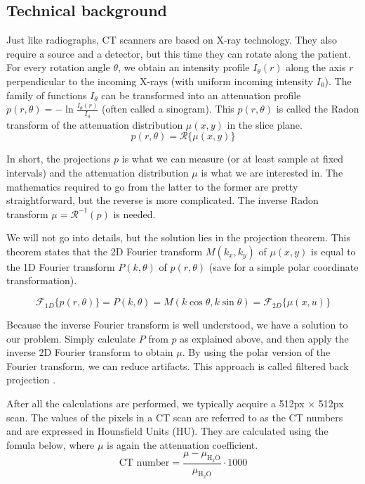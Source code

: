 \subsection{Technical background}
Just like radiographs, CT scanners are based on X-ray technology. They also
require a source and a detector, but this time they can rotate along the
patient. For every rotation angle $\theta$, we obtain an intensity profile
$I_\theta(r)$ along the axis $r$ perpendicular to the incoming X-rays (with
uniform incoming intensity $I_0$). The family of functions $I_\theta$ can be
transformed into an attenuation profile $p(r, \theta) = -\ln \tfrac{I_\theta(r)}{I_0}$
(often called a sinogram). This $p(r, \theta)$ is called the Radon transform of
the attenuation distribution $\mu(x,y)$ in the slice plane.
\begin{equation}
	p(r, \theta) = \mathscr{R}\{ \mu(x,y) \}
\end{equation}

In short, the projections $p$ is what we can measure (or at least sample at
fixed intervals) and the attenuation distribution $\mu$ is what we are
interested in. The mathematics required to go from the latter to the former are
pretty straightforward, but the reverse is more complicated. The inverse Radon
transform $\mu = \mathscr{R}^{-1}(p)$ is needed.

We will not go into details, but the solution lies in the projection theorem.
This theorem states that the 2D Fourier transform $M(k_x, k_y)$ of $\mu(x,y)$
is equal to the 1D Fourier transform $P(k, \theta)$ of $p(r, \theta)$ (save for
a simple polar coordinate transformation).

\begin{equation}
\mathscr{F}_{1D}\{ p(r, \theta) \} = P(k, \theta) = M(k \cos \theta, k \sin
\theta) = \mathscr{F}_{2D}\{ \mu(x, u) \}
\end{equation}

Because the inverse Fourier transform is well understood, we have a solution to
our problem. Simply calculate $P$ from $p$ as explained above, and then apply
the inverse 2D Fourier transform to obtain $\mu$. By using the polar version of
the Fourier transform, we can reduce artifacts. This approach is called filtered
back projection \cite{suetens}.

After all the calculations are performed, we typically acquire a 512px $\times$
512px scan. The values of the pixels in a CT scan are referred to as the CT
numbers and are expressed in Hounsfield Units (HU). They are calculated using
the fomula below, where $\mu$ is again the attenuation coefficient.
\begin{equation}
	\text{CT number} = \frac{\mu -
	\mu_{\text{H}_2\text{O}}}{\mu_{\text{H}_2\text{O}}} \cdot 1000
\end{equation}

